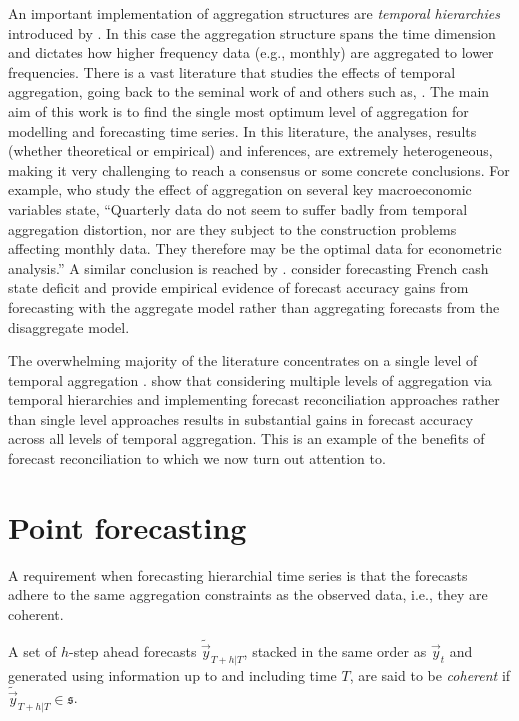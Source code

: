 \documentclass[graybox]{svmult}
\begin{document}
An important implementation of aggregation structures are \textit{temporal hierarchies} introduced by \cite{AthEtAl2017}. In this case the aggregation structure spans the time dimension and dictates how higher frequency data (e.g., monthly) are aggregated to lower frequencies. There is a vast literature that studies the effects of temporal aggregation, going back to the seminal work of \cite{ZelMon1971, AmeWu1972, Tia1972, Bre1973} and others such as, \cite{Hot1993, HotCar1993, Mar1999, SilEtAl2008}. The main aim of this work is to find the single most optimum level of aggregation for modelling and forecasting time series. In this literature, the analyses, results (whether theoretical or empirical) and inferences, are extremely heterogeneous, making it very challenging to reach a consensus or some concrete conclusions. For example, \cite{RosSea1995} who study the effect of aggregation on several key macroeconomic variables state, ``Quarterly data do not seem to suffer badly from temporal aggregation distortion, nor are they subject to the construction problems affecting monthly data. They therefore may be the optimal data for econometric analysis.'' A similar conclusion is reached by \cite{NijPal1990}. \cite{SilEtAl2008} consider forecasting French cash state deficit and provide empirical evidence of forecast accuracy gains from forecasting with the aggregate model rather than aggregating forecasts from the disaggregate model.

The overwhelming majority of the literature concentrates on a single level of temporal aggregation \citep[there are some notable exceptions such as,][]{AndEtAl2011,KouEtAl2014}. \cite{AthEtAl2017} show that considering multiple levels of aggregation via temporal hierarchies and implementing forecast reconciliation approaches rather than single level approaches results in substantial gains in forecast accuracy across all levels of temporal aggregation. This is an example of the benefits of forecast reconciliation to which we now turn out attention to.

\section{Point forecasting}\label{sec:point forecasting}

A requirement when forecasting hierarchial time series is that the forecasts adhere to the same aggregation constraints as the observed data, i.e., they are coherent.

\begin{definition}
A set of $h$-step ahead forecasts $\tilde{\vec{y}}_{T+h|T}$, stacked in the same order as $\vec{y}_{t}$ and generated using information up to and including time $T$,
are said to be \textit{coherent} if $\tilde{\vec{y}}_{T+h|T} \in \mathfrak{s}$.
  \label{def:coherence}
\end{definition}
\end{document}
